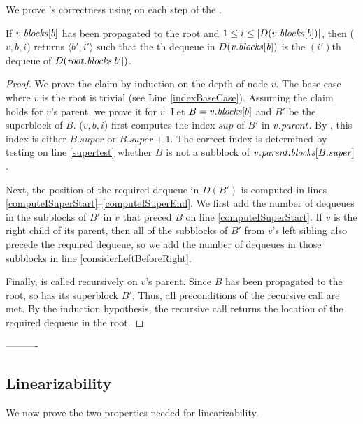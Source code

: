 
We prove 's correctness using  on each step of the .

\begin{lemma}
If $v.\mbox{\textit{blocks}}[b]$ has been propagated to the root and $1\leq i\leq |D(v.\mbox{\textit{blocks}}[b])|$, 
 then ($v, b, i$) returns $\langle b',i'\rangle$ such that the th dequeue in $D(\mbox{\textnormal{\textit{v}}}.\mbox{\textit{blocks}}[\mbox{\textnormal{\textit{b}}}])$ is the $(i')$th dequeue of $D(\mbox{\textnormal{\textit{root}}}.\mbox{\textit{blocks}}[b'])$.
\end{lemma}
\begin{proof}
We prove the claim by induction on the depth of node $v$. The base case where $v$ is the root is trivial (see Line \ref{indexBaseCase}).
Assuming the claim holds for $v$'s parent, we prove it for $v$.
Let $B=v.\mbox{\textit{blocks}}[b]$ and $B'$ be the superblock of $B$.
($v, b, i$) first computes the index $sup$ of $B'$ in $v.\mbox{\textit{parent}}$.
By , this index is either $B.super$ or $B.super+1$.
The correct index is determined by testing on line \ref{supertest} whether $B$ is not a subblock of $v.\mbox{\textit{parent.blocks}}[B.\mbox{\textit{super}}]$.

Next, the position of the required dequeue in $D(B')$ is computed in 
lines \ref{computeISuperStart}--\ref{computeISuperEnd}. 
We first add the number of dequeues in the subblocks of $B'$ in $v$ that preced $B$ on line \ref{computeISuperStart}.
If $v$ is the right child of its parent, then all of the subblocks of $B'$ from $v$'s left sibling
also precede the required dequeue, so we add the number of dequeues in those subblocks in line \ref{considerLeftBeforeRight}.

Finally,  is called recursively on $v$'s parent.
Since $B$ has been propagated to the root, so has its superblock $B'$.
Thus, all preconditions of the recursive call are met.
By the induction hypothesis, the recursive call returns the location of the required dequeue in the root.\end{proof}

----------

\subsection{Linearizability}
We now prove the two properties needed for linearizability.

